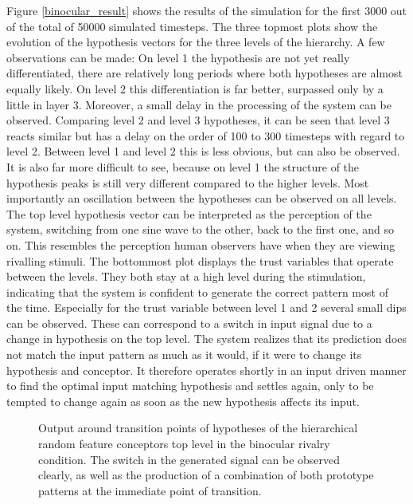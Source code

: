 \documentclass[utf8]{frontiersSCNS} %
\begin{document}
	Figure \ref{binocular_result} shows the results of the simulation for the first 3000 out of the total of 50000 simulated timesteps. The three topmost plots show the evolution of the hypothesis vectors for the three levels of the hierarchy. A few observations can be made: On level 1 the hypothesis are not yet really differentiated, there are relatively long periods where both hypotheses are almost equally likely. On level 2 this differentiation is far better, surpassed only by a little in layer 3. Moreover, a small delay in the processing of the system can be observed. Comparing level 2 and level 3 hypotheses, it can be seen that level 3 reacts similar but has a delay on the order of 100 to 300 timesteps with regard to level 2. Between level 1 and level 2 this is less obvious, but can also be observed. It is also far more difficult to see, because on level 1 the structure of the hypothesis peaks is still very different compared to the higher levels. Most importantly an oscillation between the hypotheses can be observed on all levels. The top level hypothesis vector can be interpreted as the perception of the system, switching from one sine wave to the other, back to the first one, and so on. This resembles the perception human observers have when they are viewing rivalling stimuli.  
	The bottommost plot displays the trust variables that operate between the levels. They both stay at a high level during the stimulation, indicating that the system is confident to generate the correct pattern most of the time. Especially for the trust variable between level 1 and 2 several small dips can be observed. These can correspond to a switch in input signal due to a change in hypothesis on the top level. The system realizes that its prediction does not match the input pattern as much as it would, if it were to change its hypothesis and conceptor. It therefore operates shortly in an input driven manner to find the optimal input matching hypothesis and settles again, only to be tempted to change again as soon as the new hypothesis affects its input.  

    \begin{figure}
           	\centering
       	    

      	\caption[Output of the HRFC in the binocular rivalry condition]{Output around transition points of hypotheses of the hierarchical random feature conceptors top level in the binocular rivalry condition. The switch in the generated signal can be observed clearly, as well as the production of a combination of both prototype patterns at the immediate point of transition. }
        \label{predictions}
    \end{figure}
\end{document}
